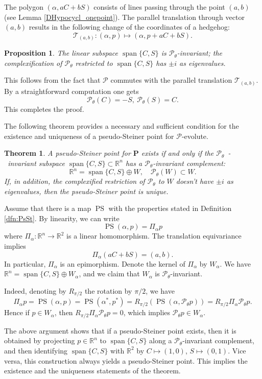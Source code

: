 \documentclass[12pt]{article}
\makeatletter
\newtheorem{proposition}[lemma]{Proposition}
\newtheorem{theorem}{Theorem}
\renewenvironment{proof}[1][\proofname] 
{\par\pushQED{\qed}\normalfont\topsep6\p@\@plus6\p@\relax\trivlist\item[\hskip\labelsep\bfseries#1\@addpunct{.}]\ignorespaces}{\popQED\endtrivlist\@endpefalse}
\newcommand{\R}{\mathbb {R}}
\newcommand{\Pev}{\mathcal{P}}
\renewcommand{\P}{\mathbf{P}}
\newcommand{\lin}{\operatorname{span}}
\newcommand{\PS}{\operatorname{PS}}
\makeatother
\begin{document}
The polygon $(\alpha, aC+bS)$ consists of lines passing through the point $(a,b)$ (see Lemma \ref{DHypocycl_onepoint}). The parallel translation through vector $(a,b)$ results in the following change of the coordinates of a hedgehog:
\[ \mathcal{T}_{(a,b)}: (\alpha,p) \mapsto (\alpha, p + aC + bS). \]

\begin{proposition}
\label{Pinvariant}
The linear subspace $\lin\{C, S\}$ is $\Pev_\theta$-invariant; the complexification of $\Pev_\theta$ restricted to $\lin\{C, S\}$ has $\pm i$ as eigenvalues.
\end{proposition}
\begin{proof}
This follows from the fact that  $\Pev$  commutes with the parallel translation $\mathcal{T}_{(a,b)}$. By a straightforward computation one gets
\begin{equation}
\label{invplane}
\Pev_{\theta} (C) = -S,\ \Pev_{\theta} (S) = C.
\end{equation}
This completes the proof.
\end{proof}

The following theorem provides a necessary and sufficient condition for the existence and uniqueness of a pseudo-Steiner point for $\Pev$-evolute.

\begin{theorem}
\label{thm:PsSt}
A pseudo-Steiner point for $\P$  exists if and only if the $\Pev_\theta$~-~invariant subspace $\lin\{C, S\} \subset \R^n$ has a $\Pev_\theta$-invariant complement:
\[ \R^n = \lin\{C, S\} \oplus W, \quad \Pev_\theta(W) \subset W. \]
If, in addition, the complexified restriction of $\Pev_\theta$ to $W$ doesn't have $\pm i$ as eigenvalues, then the pseudo-Steiner point is unique.
\end{theorem}

\begin{proof}
Assume that there is a map $\PS$ with the properties stated in Definition \ref{dfn:PsSt}. By  linearity, we can write
\[ \PS(\alpha, p) = \Pi_\alpha p \]
where $\Pi_\alpha \colon \R^n \to \R^2$ is a linear homomorphism. The translation equivariance implies
\[ \Pi_\alpha(aC+ bS) = (a,b). \]
In particular, $\Pi_\alpha$ is an epimorphism. Denote the kernel of $\Pi_\alpha$ by $W_\alpha$. We have $\R^n = \lin\{C, S\} \oplus W_\alpha$, and we claim that $W_\alpha$ is $\Pev_\theta$-invariant. 

Indeed, denoting by ${R}_{\pi/2}$ the rotation by $\pi/2$, we have
\[ \Pi_\alpha p = \PS(\alpha, p) = \PS(\alpha^*, p^*) = {R}_{\pi/2} (\PS(\alpha, \Pev_\theta p)) = {R}_{\pi/2} \Pi_\alpha \Pev_\theta p. \]
Hence if $p \in W_\alpha$, then ${R}_{\pi/2} \Pi_\alpha \Pev_\theta p = 0$, which implies $\Pev_\theta p \in W_\alpha$.
	
The above argument shows that if a pseudo-Steiner point exists, then it is obtained by projecting $p \in \R^n$ to $\lin\{C, S\}$ along a $\Pev_\theta$-invariant complement, and then identifying $\lin\{C, S\}$ with $\R^2$ by $C \mapsto (1,0)$, $S \mapsto (0,1)$. Vice versa, this construction always yields a pseudo-Steiner point. This implies the existence and the uniqueness statements of the theorem.
\end{proof}
\end{document}
